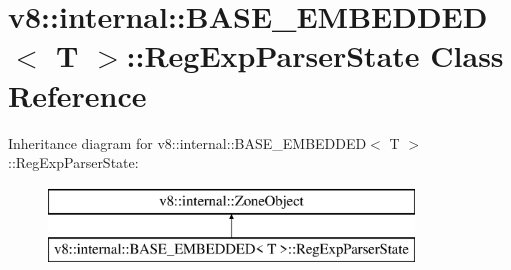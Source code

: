 \hypertarget{classv8_1_1internal_1_1_b_a_s_e___e_m_b_e_d_d_e_d_1_1_reg_exp_parser_state}{}\section{v8\+:\+:internal\+:\+:B\+A\+S\+E\+\_\+\+E\+M\+B\+E\+D\+D\+ED$<$ T $>$\+:\+:Reg\+Exp\+Parser\+State Class Reference}
\label{classv8_1_1internal_1_1_b_a_s_e___e_m_b_e_d_d_e_d_1_1_reg_exp_parser_state}
Inheritance diagram for v8\+:\+:internal\+:\+:B\+A\+S\+E\+\_\+\+E\+M\+B\+E\+D\+D\+ED$<$ T $>$\+:\+:Reg\+Exp\+Parser\+State\+:\begin{figure}[H]
\begin{center}
\leavevmode
\includegraphics[height=2.000000cm]{classv8_1_1internal_1_1_b_a_s_e___e_m_b_e_d_d_e_d_1_1_reg_exp_parser_state}
\end{center}
\end{figure}
